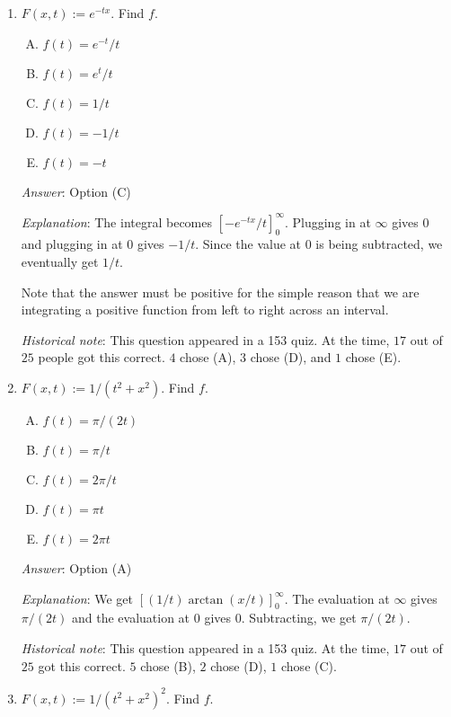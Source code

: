 \documentclass[10pt]{amsart}
\begin{document}
\begin{enumerate}

\item $F(x,t) := e^{-tx}$. Find $f$.

  \begin{enumerate}[(A)]
  \item $f(t) = e^{-t}/t$
  \item $f(t) = e^t/t$
  \item $f(t) = 1/t$
  \item $f(t) = -1/t$
  \item $f(t) = -t$
  \end{enumerate}

  {\em Answer}: Option (C)

  {\em Explanation}: The integral becomes
  $[-e^{-tx}/t]_0^\infty$. Plugging in at $\infty$ gives $0$ and
  plugging in at $0$ gives $-1/t$. Since the value at $0$ is being
  subtracted, we eventually get $1/t$.

  Note that the answer must be positive for the simple reason that we
  are integrating a positive function from left to right across an
  interval.

  {\em Historical note}: This question appeared in a 153 quiz. At the
  time, $17$ out of $25$ people got this correct. $4$ chose (A), $3$
  chose (D), and $1$ chose (E).

\item $F(x,t) := 1/(t^2 + x^2)$. Find $f$.

  \begin{enumerate}[(A)]
  \item $f(t) = \pi/(2t)$
  \item $f(t) = \pi/t$
  \item $f(t) = 2\pi/t$
  \item $f(t) = \pi t$
  \item $f(t) = 2\pi t$
  \end{enumerate}

  {\em Answer}: Option (A)

  {\em Explanation}: We get $[(1/t)\arctan(x/t)]_0^\infty$. The
  evaluation at $\infty$ gives $\pi/(2t)$ and the evaluation at $0$
  gives $0$. Subtracting, we get $\pi/(2t)$.

  {\em Historical note}: This question appeared in a 153 quiz. At the
  time, $17$ out of $25$ got this correct. $5$ chose (B), $2$ chose
  (D), $1$ chose (C).

\item $F(x,t) := 1/(t^2 + x^2)^2$. Find $f$.


\end{enumerate}
\end{document}
